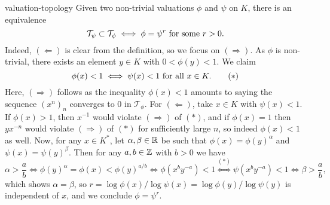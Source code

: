 \begin{example}{valuation-topology}
    Given two non-trivial valuations $\phi$ and $\psi$ on $K$, there is an equivalence
    \[ \mathcal{T}_\psi \subset \mathcal{T}_\phi \iff  \phi = \psi^r \textup{ for some } r > 0 . \]
    Indeed, $(\Leftarrow)$ is clear from the definition, so we focus on $(\Rightarrow)$.
    As $\phi$ is non-trivial, there exists an element $y \in K$ with $0 < \phi(y) < 1$. We claim
    \[ \phi(x) < 1 \iff \psi(x) < 1 \textup{ for all } x \in K . \tag{$*$} \]
    Here, $(\Rightarrow)$ follows as the inequality $\phi(x) < 1$ amounts to saying the sequence $(x^n)_n$ converges to $0$ in $\mathcal{T}_\phi$. For $(\Leftarrow)$, take $x \in K$ with $\psi(x) < 1$. If $\phi(x) > 1$, then $x^{-1}$ would violate $(\Rightarrow)$ of $(*)$, and if $\phi(x) = 1$ then $yx^{-n}$ would violate $(\Rightarrow)$ of $(*)$ for sufficiently large $n$, so indeed $\phi(x) < 1$ as well.
    Now, for any $x \in K^*$, let $\alpha, \beta \in \mathbb{R}$ be such that $\phi(x) = \phi(y)^\alpha$ and $\psi(x) = \psi(y)^\beta$. Then for any $a, b \in \mathbb{Z}$ with $b > 0$ we have
    \[ \alpha > \frac{a}{b} \iff \phi(y)^\alpha = \phi(x) < \phi(y)^{a/b} \iff \phi(x^b y^{-a}) < 1 \overset{(*)}{\iff} \psi(x^b y^{-a}) < 1 \iff \beta > \frac{a}{b} , \]
    which shows $\alpha = \beta$, so $r = \log \phi(x) / \log \psi(x) = \log \phi(y) / \log \psi(y)$ is independent of $x$, and we conclude $\phi = \psi^r$.
\end{example}
